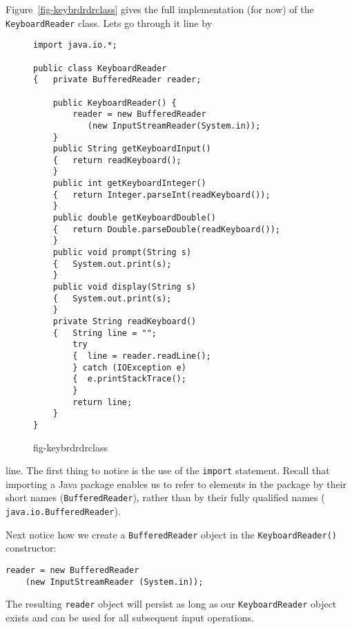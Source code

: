 Figure~\ref{fig-keybrdrdrclass} gives the full implementation (for
now) of the {\tt Key\-board\-Read\-er} class. Lets go through it line by
\begin{figure}[h!]
\jjjprogstart
\begin{jjjlisting}
\begin{lstlisting}
import java.io.*;

public class KeyboardReader 
{   private BufferedReader reader;

    public KeyboardReader() {
        reader = new BufferedReader
           (new InputStreamReader(System.in));
    }
    public String getKeyboardInput() 
    {   return readKeyboard();
    }
    public int getKeyboardInteger() 
    {   return Integer.parseInt(readKeyboard());
    }
    public double getKeyboardDouble() 
    {   return Double.parseDouble(readKeyboard());
    }
    public void prompt(String s) 
    {   System.out.print(s);
    }
    public void display(String s) 
    {   System.out.print(s);
    }
    private String readKeyboard() 
    {   String line = "";
        try 
        {  line = reader.readLine();
        } catch (IOException e) 
        {  e.printStackTrace();
        }
        return line;
    }
}
\end{lstlisting}
\end{jjjlisting}
{fig-keybrdrdrclass}
\end{figure}
line. The first thing to notice is the use of the {\tt import}
statement. Recall that importing a Java package enables us to refer to
elements in the package by their short names ({\tt BufferedReader}),
rather than by their fully qualified names ({\tt
java.io.BufferedReader}).


Next notice how we create a {\tt BufferedReader} object in
the {\tt KeyboardReader()} constructor:

\begin{jjjlisting}
\begin{lstlisting}
reader = new BufferedReader 
    (new InputStreamReader (System.in)); 
\end{lstlisting}
\end{jjjlisting}

\noindent The resulting {\tt reader} object will persist as long
as our {\tt KeyboardReader} object exists and can be used for
all subsequent input operations.


